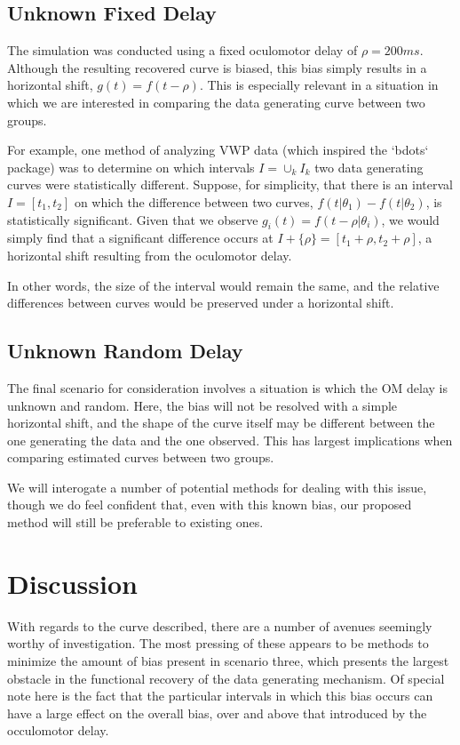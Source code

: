 \documentclass{article}
\begin{document}
\subsection{Unknown Fixed Delay}


The simulation was conducted using a fixed oculomotor delay of $\rho = 200ms$. Although the resulting recovered curve is biased, this bias simply results in a horizontal shift, $g(t) = f(t - \rho)$. This is especially relevant in a situation in which we are interested in comparing the data generating curve between two groups. 

For example, one method of analyzing VWP data (which inspired the `bdots` package) was to determine on which intervals $I = \cup_{k} I_k$ two data generating curves were statistically different. Suppose, for simplicity, that there is an interval $I = [t_1, t_2]$ on which the difference between two curves, $f(t | \theta_1) - f(t|\theta_2)$, is statistically significant. Given that we observe $g_i(t) = f(t - \rho | \theta_i)$, we would simply find that a significant difference occurs at $I + \{\rho\} = [t_1 + \rho, t_2 + \rho]$, a horizontal shift resulting from the oculomotor delay.

In other words, the size of the interval would remain the same, and the relative differences between curves would be preserved under a horizontal shift. 

\subsection{Unknown Random Delay}


The final scenario for consideration involves a situation is which the OM delay is unknown and random. Here, the bias will not be resolved with a simple horizontal shift, and the shape of the curve itself may be different between the one generating the data and the one observed. This has largest implications when comparing estimated curves between two groups.

We will interogate a number of potential methods for dealing with this issue, though we do feel confident that, even with this known bias, our proposed method will still be preferable to existing ones. 

\section{Discussion}


With regards to the curve described, there are a number of avenues seemingly worthy of investigation. The most pressing of these appears to be methods to minimize the amount of bias present in scenario three, which presents the largest obstacle in the functional recovery of the data generating mechanism. Of special note here is the fact that the particular intervals in which this bias occurs can have a large effect on the overall bias, over and above that introduced by the occulomotor delay. 
\end{document}
